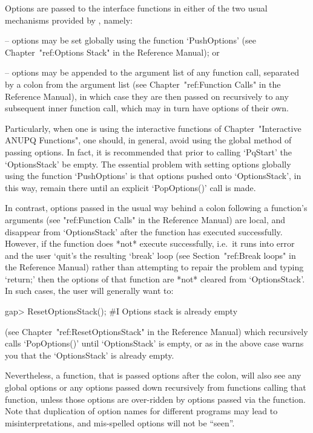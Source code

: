 Options are passed to the {\ANUPQ} interface functions in either  of  the
two usual mechanisms provided by {\GAP}, namely:

\beginlist%

\item{--} options may be set globally using  the  function  `PushOptions'
(see Chapter~"ref:Options Stack" in the {\GAP} Reference Manual); or

\item{--} options may be appended to the argument list  of  any  function
call,   separated   by   a   colon   from   the   argument   list    (see
Chapter~"ref:Function Calls" in the {\GAP} Reference  Manual),  in  which
case they are then passed on recursively to any subsequent inner function
call, which may in turn have options of their own.

\endlist

Particularly,  when  one  is   using   the   interactive   functions   of
Chapter~"Interactive ANUPQ Functions",  one  should,  in  general,  avoid
using the global method of passing options. In fact,  it  is  recommended
that  prior  to  calling  `PqStart'  the  `OptionsStack'  be  empty.  The
essential problem  with  setting  options  globally  using  the  function
`PushOptions' is that options pushed onto `OptionsStack',  in  this  way,
remain there until an explicit `PopOptions()' call is made.

In contrast, options passed in the usual way behind a colon  following  a
function's arguments (see "ref:Function Calls" in  the  {\GAP}  Reference
Manual) are local, and disappear from `OptionsStack' after  the  function
has executed successfully. However, if the function  does  *not*  execute
successfully, i.e.~it runs into error and the user `quit's the  resulting
`break' loop (see Section~"ref:Break  loops"  in  the  Reference  Manual)
rather than attempting to repair the problem and  typing  `return;'  then
the options of that function are *not* cleared  from  `OptionsStack'.  In
such cases, the user will generally want to:

\beginexample
gap> ResetOptionsStack();
#I  Options stack is already empty
\endexample

(see Chapter~"ref:ResetOptionsStack"  in  the  {\GAP}  Reference  Manual)
which recursively calls `PopOptions()' until `OptionsStack' is empty, or
as in the above case warns you that the `OptionsStack' is already empty.

Nevertheless, a function, that is passed options after  the  colon,  will
also see any global options or any options passed down  recursively  from
functions calling that function, unless those options are over-ridden  by
options passed via the function. Note that duplication  of  option  names
for different programs may lead to  misinterpretations,  and  mis-spelled
options will not be ``seen''.

